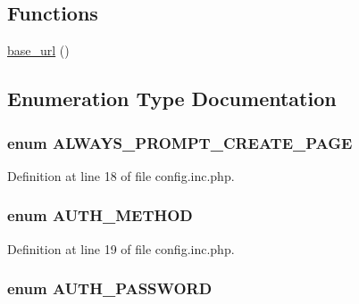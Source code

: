 \subsection*{Functions}
\begin{DoxyCompactItemize}
\item 
\hyperlink{config_8inc_8php_a8fdfb46e432b25bbdad23971a23a26b5}{base\_\-url} ()
\end{DoxyCompactItemize}


\subsection{Enumeration Type Documentation}
\hypertarget{config_8inc_8php_af7115c186e2e18cb1839aed9d163b31a}{
\subsubsection[{ALWAYS\_\-PROMPT\_\-CREATE\_\-PAGE}]{\setlength{\rightskip}{0pt plus 5cm}enum {\bf ALWAYS\_\-PROMPT\_\-CREATE\_\-PAGE}}}
\label{config_8inc_8php_af7115c186e2e18cb1839aed9d163b31a}


Definition at line 18 of file config.inc.php.

\hypertarget{config_8inc_8php_a2ee7e30fa45253c5e303994703d3293f}{
\subsubsection[{AUTH\_\-METHOD}]{\setlength{\rightskip}{0pt plus 5cm}enum {\bf AUTH\_\-METHOD}}}
\label{config_8inc_8php_a2ee7e30fa45253c5e303994703d3293f}


Definition at line 19 of file config.inc.php.

\hypertarget{config_8inc_8php_adf2112da607b39714ba9cca31b42a93a}{
\subsubsection[{AUTH\_\-PASSWORD}]{\setlength{\rightskip}{0pt plus 5cm}enum {\bf AUTH\_\-PASSWORD}}}
\label{config_8inc_8php_adf2112da607b39714ba9cca31b42a93a}


